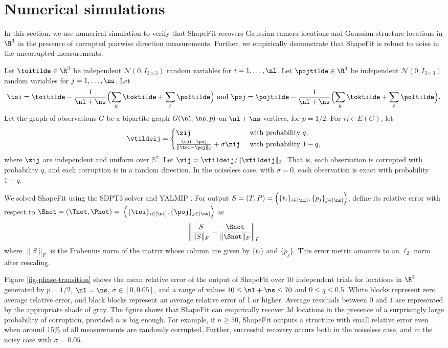 
\section{Numerical simulations} \label{sec-simulations}


In this section, we use numerical simulation to verify that ShapeFit recovers Gaussian camera locations and Gaussian structure locations in $\R^3$ in the presence of corrupted pairwise direction measurements.  Further, we empirically demonstrate that ShapeFit is robust to noise in the uncorrupted measurements.

Let $\toitilde \in \R^3$ be independent $\mathcal{N}(0, I_{3 \times 3})$ random variables for $i = 1, \ldots, \nl$.  Let $\pojtilde \in \R^3$ be independent $\mathcal{N}(0, I_{3 \times 3})$ random variables for $j = 1, \ldots, \ns$.  
Let 
\[\toi = \toitilde - \frac{1}{\nl + \ns}\Bigl( \sum_k \toktilde + \sum_\ell \poltilde \Bigr) \text{ and } \poj = \pojtilde -  \frac{1}{\nl + \ns} \Bigl( \sum_k \toktilde + \sum_\ell \poltilde \Bigr).
\]
Let the graph of observations $G$ be a bipartite \erdosrenyi graph  $G(\nl, \ns, p)$ on $\nl + \ns$ vertices, for $p = 1/2$.
  For $ij \in E(G)$, let
\[
\vtildeij = \begin{cases} \zij & \text{ with probability } q,  \\[0.2em]
\frac{\toi - \poj}{\| \toi - \poj\|_2} + \sigma \zij & \text{ with probability } 1-q,
\end{cases}
\]
where $\zij$ are independent and uniform over $\mathbb{S}^2$. Let $\vij = \vtildeij / \| \vtildeij\|_2$. That is, each observation is corrupted with probability $q$, and each corruption is in a random direction.  In the noiseless case, with $\sigma = 0$, each observation is exact with probability $1-q$.  

We solved ShapeFit using the SDPT3 solver \cite{TTT1999, TTT2003} and YALMIP \cite{L2004}.  For output $S = (T,P) = \Bigl(\{ t_i\}_{i \in [\nl]}, \{ p_j\}_{j \in [\ns]}\Bigr)$, define its relative error with respect to $\Snot = (\Tnot, \Pnot) =$ $\Bigl(\{\toi\}_{i \in [\nl]},\{\poj\}_{j \in [\ns]} \Bigr)$ as
\[
\left \| \frac{S}{\|S\|_F} - \frac{\Snot}{\|\Snot\|_F} \right \|_F 
\]
where $\|S\|_F$ is the Frobenius norm of the matrix whose column are given by $\{t_i\}$ and $\{p_j\}$.    This error metric amounts to an $\ell_2$ norm after rescaling.

Figure \ref{fig-phase-transition} shows the mean relative error of the output of ShapeFit over 10 independent trials for locations in $\R^3$ generated by $p = 1/2$, $\nl = \ns$, $\sigma \in [0, 0.05]$, and a range of values $10 \leq \nl + \ns \leq 70$ and $0 \leq q \leq 0.5$.   White blocks represent zero average relative error, and black blocks represent an average relative error of 1 or higher.  Average residuals between $0$ and $1$ are represented by the appropriate shade of gray.  The figure shows that ShapeFit can empirically recover 3d locations in the presence of a surprisingly large probability of corruption, provided $n$ is big enough. For example, if $n \geq 50$, ShapeFit outputs a structure with small relative error even when around 15\% of all measurements are randomly corrupted.  Further, successful recovery occurs both in the noiseless case, and in the noisy case with $\sigma=0.05$.  


